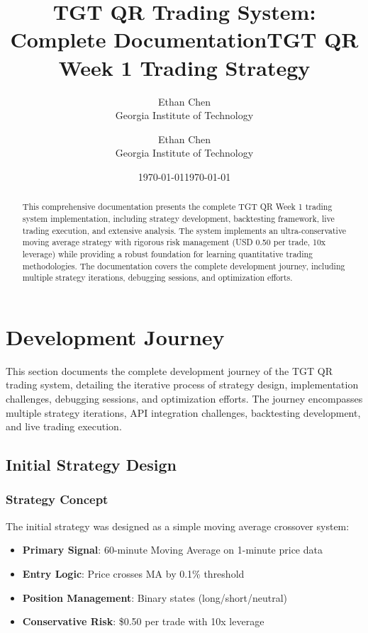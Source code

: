 \documentclass[12pt,a4paper]{article}
\title{TGT QR Trading System: Complete Documentation}
\author{Ethan Chen \\ Georgia Institute of Technology}
\date{\today}
\title{TGT QR Week 1 Trading Strategy}
\author{Ethan Chen \\ Georgia Institute of Technology}
\date{\today}
\begin{document}
\maketitle

\begin{abstract}
This comprehensive documentation presents the complete TGT QR Week 1 trading system implementation, including strategy development, backtesting framework, live trading execution, and extensive analysis. The system implements an ultra-conservative moving average strategy with rigorous risk management (USD 0.50 per trade, 10x leverage) while providing a robust foundation for learning quantitative trading methodologies. The documentation covers the complete development journey, including multiple strategy iterations, debugging sessions, and optimization efforts.
\end{abstract}

\tableofcontents
\newpage

\section{Development Journey}

This section documents the complete development journey of the TGT QR trading system, detailing the iterative process of strategy design, implementation challenges, debugging sessions, and optimization efforts. The journey encompasses multiple strategy iterations, API integration challenges, backtesting development, and live trading execution.

\subsection{Initial Strategy Design}

\subsubsection{Strategy Concept}
The initial strategy was designed as a simple moving average crossover system:

\begin{itemize}
\item \textbf{Primary Signal}: 60-minute Moving Average on 1-minute price data
\item \textbf{Entry Logic}: Price crosses MA by 0.1\% threshold
\item \textbf{Position Management}: Binary states (long/short/neutral)
\item \textbf{Conservative Risk}: \$0.50 per trade with 10x leverage
\end{itemize}
\end{document}
